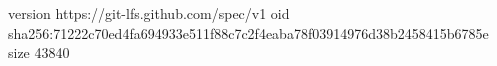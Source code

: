 version https://git-lfs.github.com/spec/v1
oid sha256:71222c70ed4fa694933e511f88c7c2f4eaba78f03914976d38b2458415b6785e
size 43840
